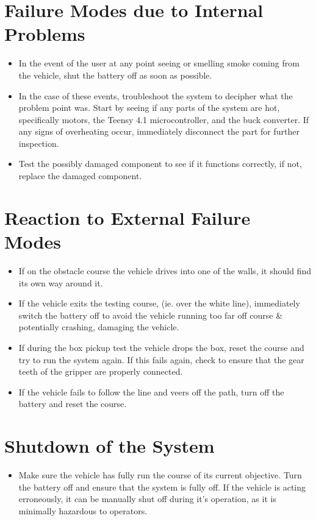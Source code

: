 \documentclass[11pt]{report}
\begin{document}
\section{Failure Modes due to Internal Problems}
\begin{itemize}
    \item In the event of the user at any point seeing or smelling smoke coming from the vehicle, shut the battery off as soon as possible. 
    \item In the case of these events, troubleshoot the system to decipher what the problem point was. Start by seeing if any parts of the system are hot, specifically motors, the Teensy 4.1 microcontroller, and the buck converter. If any signs of overheating occur, immediately disconnect the part for further inspection.
    \item Test the possibly damaged component to see if it functions correctly, if not, replace the damaged component.
\end{itemize}
\section{Reaction to External Failure Modes}
\begin{itemize}
    \item If on the obstacle course the vehicle drives into one of the walls, it should find its own way around it. 
    \item If the vehicle exits the testing course, (ie. over the white line), immediately switch the battery off to avoid the vehicle running too far off course \& potentially crashing, damaging the vehicle.
    \item If during the box pickup test the vehicle drops the box, reset the course and try to run the system again. If this fails again, check to ensure that the gear teeth of the gripper are properly connected.
    \item If the vehicle fails to follow the line and veers off the path, turn off the battery and reset the course. 
\end{itemize}
\section{Shutdown of the System}
\begin{itemize}
    \item Make sure the vehicle has fully run the course of its current objective. Turn the battery off and ensure that the system is fully off. If the vehicle is acting erroneously, it can be manually shut off during it's operation, as it is minimally hazardous to operators.
\end{itemize}
\end{document}
